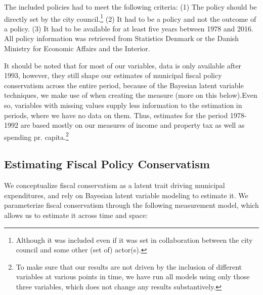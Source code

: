 \documentclass[a4paper,12pt]{article}
\begin{document}
The included policies had to meet the following criteria: (1) The policy should be directly set by the city council.\footnote{Although it was included even if it was set in collaboration between the city council and some other  (set of) actor(s).} (2) It had to be a policy and not the outcome of a policy. (3) It had to be available for at least five years between 1978 and 2016. All policy information was retrieved from Statistics Denmark or the Danish Ministry for Economic Affairs and the Interior.



It should be noted that for most of our variables, data is only available after 1993, however, they still shape our estimates of municipal fiscal policy conservatism across the entire period, because of the Bayesian latent variable techniques, we make use of when creating the measure (more on this below).Even so, variables with missing values supply less information to the estimation in periods, where we have no data on them. Thus, estimates for the period 1978-1992 are based mostly on our measures of income and property tax as well as spending pr. capita.\footnote{To make sure that our results are not driven by the inclusion of different variables at various points in time, we have run all models using only those three variables, which does not change any results substantively.}


\subsection*{Estimating Fiscal Policy Conservatism}
We conceptualize fiscal conservatism as a latent trait driving municipal expenditures, and rely on Bayesian latent variable modeling to estimate it. We parameterize fiscal conservatism through the following measurement model, which allows us to estimate it across time and space:
\end{document}
